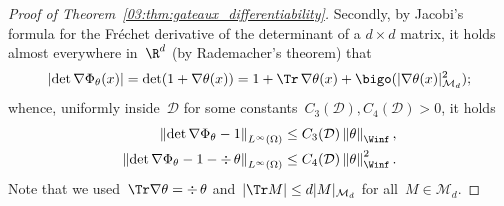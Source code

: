 \begin{proof}[Proof of Theorem~\ref{03:thm:gateaux_differentiability}]
    Secondly, by Jacobi's formula for the Fréchet derivative of the determinant of a $d\times d$ matrix, it holds almost everywhere in~$\R^d$ (by Rademacher's theorem) that
    \begin{equation}
        \left|\det \nabla \Phi_\theta(x)\right| = \det(1+\nabla \theta(x)) = 1 + \Tr\,\nabla \theta(x) + \bigo(|\nabla\theta(x)|^2_{\mathcal M_d});
    \end{equation}
    whence, uniformly inside~$\mathcal D$ for some constants~$C_3(\mathcal D),C_4(\mathcal D)>0$, it holds
    \begin{equation}
        \label{03:eq:divergence_estimate}
        \begin{aligned}
            \left\|\det \nabla\Phi_\theta-1\right\|_{L^\infty(\Omega)} &\leq C_3(\mathcal D)\left\|\theta\right\|_{\Winf},\\
            \left\|\det \nabla\Phi_\theta-1-\div\,\theta\right\|_{L^\infty(\Omega)} &\leq C_4(\mathcal D)\left\|\theta\right\|_{\Winf}^2.
        \end{aligned}
    \end{equation}
    Note that we used~$\Tr\nabla \theta = \div\,\theta$ and~$|\Tr M|\leq d|M|_{\mathcal M_d}$ for all~$M\in \mathcal M_d$.


\end{proof}
